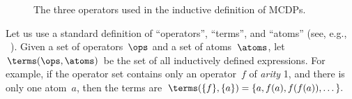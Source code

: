 \begin{figure}[h]
  \centering{}\hfill{}\hfill{}\hfill{}\smallskip{}
  \caption{\label{fig:series-par-loop}The three operators used in the inductive
  definition of MCDPs.}
\end{figure}

Let us use a standard definition of ``operators'', ``terms'',
and ``atoms'' (see, e.g., ~\cite[p.41]{jezek08}). Given a set
of operators~$\ops$ and a set of atoms~$\atoms$, let~$\terms(\ops,\atoms)$
be the set of all inductively defined expressions. For example, if
the operator set contains only an operator~$f$ of \emph{arity} 1,
and there is only one atom~$a$, then the terms are $\terms(\{f\},\{a\})=\{a,f(a),f(f(a)),\dots\}.$



